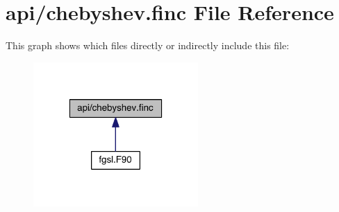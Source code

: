 \hypertarget{chebyshev_8finc}{\section{api/chebyshev.finc File Reference}
\label{chebyshev_8finc}
}
This graph shows which files directly or indirectly include this file\-:
\nopagebreak
\begin{figure}[H]
\begin{center}
\leavevmode
\includegraphics[width=178pt]{chebyshev_8finc__dep__incl}
\end{center}
\end{figure}

